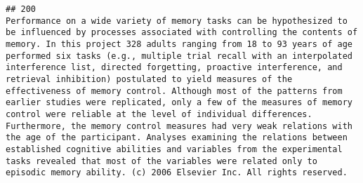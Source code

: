 \documentclass[
  english,
  man]{apa6}
\begin{document}
\begin{verbatim}
## 200                                                                                                                                                                                                                                                                                                                                                                                                                                                                                                                                                                                                                                                                                                                                                                                                                                                                                                                                                                                                                                                                                                                                                                                                                                                                                                                                                                                                                                                                                                                                                                                                                                                                                         Performance on a wide variety of memory tasks can be hypothesized to be influenced by processes associated with controlling the contents of memory. In this project 328 adults ranging from 18 to 93 years of age performed six tasks (e.g., multiple trial recall with an interpolated interference list, directed forgetting, proactive interference, and retrieval inhibition) postulated to yield measures of the effectiveness of memory control. Although most of the patterns from earlier studies were replicated, only a few of the measures of memory control were reliable at the level of individual differences. Furthermore, the memory control measures had very weak relations with the age of the participant. Analyses examining the relations between established cognitive abilities and variables from the experimental tasks revealed that most of the variables were related only to episodic memory ability. (c) 2006 Elsevier Inc. All rights reserved.

\end{verbatim}
\end{document}

